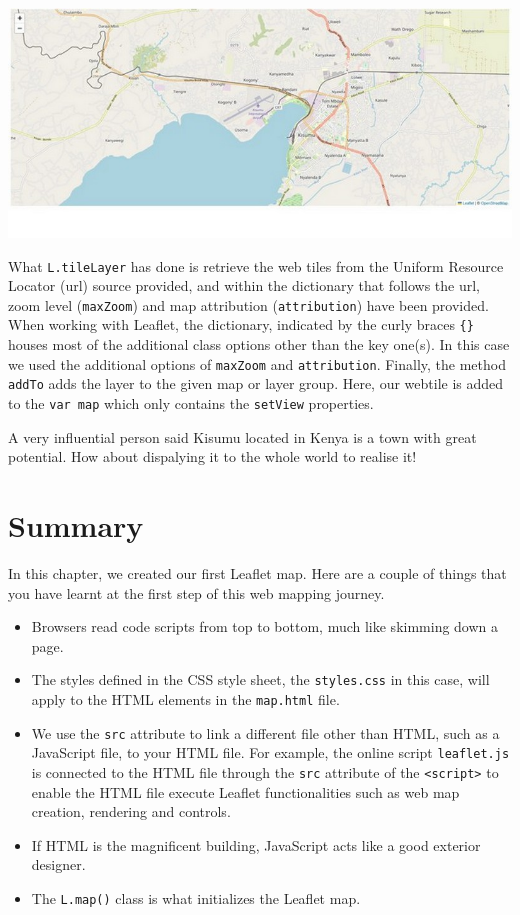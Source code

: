 \documentclass[
]{book}
\begin{document}
\includegraphics{../images/kisumu-leaflet.jpg}

What \texttt{L.tileLayer} has done is retrieve the web tiles from the Uniform Resource Locator (url) source provided, and within the dictionary that follows the url, zoom level (\texttt{maxZoom}) and map attribution (\texttt{attribution}) have been provided. When working with Leaflet, the dictionary, indicated by the curly braces \texttt{\{\}} houses most of the additional class options other than the key one(s). In this case we used the additional options of \texttt{maxZoom} and \texttt{attribution}. Finally, the method \texttt{addTo} adds the layer to the given map or layer group. Here, our webtile is added to the \texttt{var\ map} which only contains the \texttt{setView} properties.

A very influential person said Kisumu located in Kenya is a town with great potential. How about dispalying it to the whole world to realise it!

\hypertarget{summary-1}{%
\section{Summary}\label{summary-1}}

In this chapter, we created our first Leaflet map. Here are a couple of things that you have learnt at the first step of this web mapping journey.

\begin{itemize}
\item
  Browsers read code scripts from top to bottom, much like skimming down a page.
\item
  The styles defined in the CSS style sheet, the \texttt{styles.css} in this case, will apply to the HTML elements in the \texttt{map.html} file.
\item
  We use the \texttt{src} attribute to link a different file other than HTML, such as a JavaScript file, to your HTML file. For example, the online script \texttt{leaflet.js} is connected to the HTML file through the \texttt{src} attribute of the \texttt{\textless{}script\textgreater{}} to enable the HTML file execute Leaflet functionalities such as web map creation, rendering and controls.
\item
  If HTML is the magnificent building, JavaScript acts like a good exterior designer.
\item
  The \texttt{L.map()} class is what initializes the Leaflet map.
\end{itemize}
\end{document}
